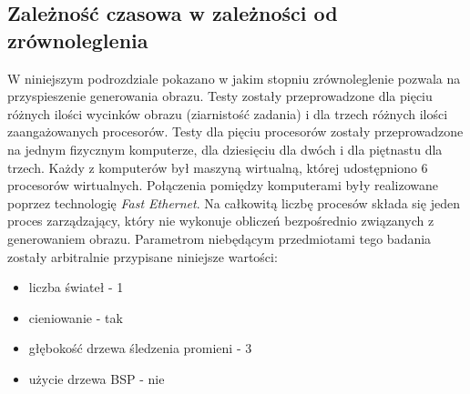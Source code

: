\subsection{Zależność czasowa w zależności od zrównoleglenia}

W niniejszym podrozdziale pokazano w jakim stopniu zrównoleglenie pozwala na przyspieszenie generowania obrazu. Testy zostały przeprowadzone dla pięciu różnych ilości wycinków obrazu (ziarnistość zadania) i dla trzech różnych ilości zaangażowanych procesorów. Testy dla pięciu procesorów zostały przeprowadzone na jednym fizycznym komputerze, dla dziesięciu dla dwóch i dla piętnastu dla trzech. Każdy z komputerów był maszyną wirtualną, której udostępniono 6 procesorów wirtualnych. Połączenia pomiędzy komputerami były realizowane poprzez technologię \emph{Fast Ethernet}. Na całkowitą liczbę procesów składa się jeden proces zarządzający, który nie wykonuje obliczeń bezpośrednio związanych z generowaniem obrazu. Parametrom niebędącym przedmiotami tego badania zostały arbitralnie przypisane niniejsze wartości:

\begin{itemize}

\item liczba świateł - 1
\item cieniowanie - tak
\item głębokość drzewa śledzenia promieni - 3
\item użycie drzewa BSP - nie

\end{itemize}

